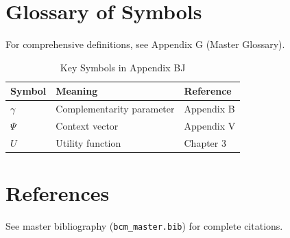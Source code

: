 
\section{Glossary of Symbols}
\label{sec:bj-glossary}

For comprehensive definitions, see Appendix G (Master Glossary).

\begin{table}[htbp]
\centering
\caption{Key Symbols in Appendix BJ}
\begin{tabular}{lll}
\toprule
\textbf{Symbol} & \textbf{Meaning} & \textbf{Reference} \\
\midrule
$\gamma$ & Complementarity parameter & Appendix B \\
$\Psi$ & Context vector & Appendix V \\
$U$ & Utility function & Chapter 3 \\
\bottomrule
\end{tabular}
\end{table}


\section{References}
\label{sec:references}

See master bibliography (\texttt{bcm\_master.bib}) for complete citations.

\nocite{bcm_master}


